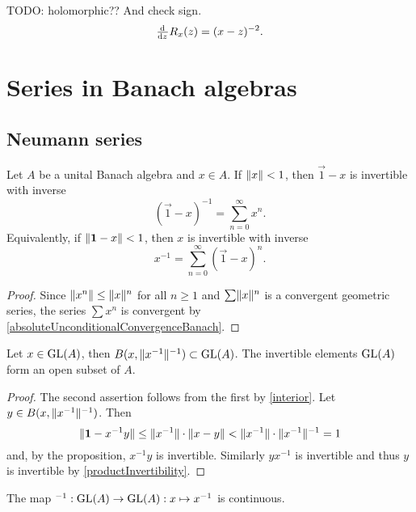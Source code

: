 \begin{lemma}
TODO: holomorphic?? And check sign.
\[ \od{}{z} R_x(z) = (x-z)^{-2}. \]
\end{lemma}

\section{Series in Banach algebras}
\subsection{Neumann series}
\begin{proposition} \label{NeumannSeries}
Let $A$ be a unital Banach algebra and $x\in A$. 
If $\lVert x\rVert<1$, then $\vec{1}-x$ is invertible with inverse
\[ (\vec{1}-x)^{-1} = \sum_{n=0}^\infty x^n. \]
Equivalently, if $\lVert\boldsymbol{\mathrm{1}}-x\rVert< 1$, then $x$ is invertible with inverse
\[ x^{-1} = \sum_{n=0}^\infty(\vec{1}-x)^n. \]
\end{proposition}
\begin{proof}
Since $\lVert x^n\rVert\leq \lVert x\rVert^n$ for all $n\geq 1$ and $\sum \lVert x\rVert^n$ is a convergent geometric series, the series $\sum x^n$ is convergent by \ref{absoluteUnconditionalConvergenceBanach}.
\end{proof}
\begin{corollary} \label{openSetInvertibles}
Let $x\in\operatorname{GL}(A)$, then $B(x,\lVert x^{-1}\rVert^{-1})\subset \operatorname{GL}(A)$. The invertible elements $\operatorname{GL}(A)$ form an open subset of $A$.
\end{corollary}
\begin{proof}
The second assertion follows from the first by \ref{interior}. Let $y\in B(x,\lVert x^{-1}\rVert^{-1})$. Then
\[ \lVert\boldsymbol{\mathrm{1}} - x^{-1}y\rVert \leq \lVert x^{-1}\rVert\cdot\lVert x-y\rVert < \lVert x^{-1}\rVert\cdot\lVert x^{-1}\rVert^{-1} = 1  \]
and, by the proposition, $x^{-1}y$ is invertible. Similarly $yx^{-1}$ is invertible and thus $y$ is invertible by \ref{productInvertibility}.
\end{proof}
\begin{corollary} \label{inverseMapContinuous}
The map $^{-1}: \operatorname{GL}(A)\to\operatorname{GL}(A): x\mapsto x^{-1}$ is continuous.
\end{corollary}
